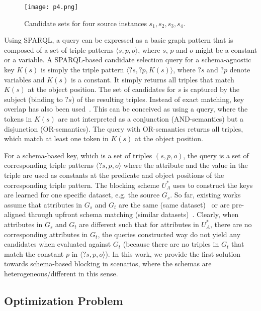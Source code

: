 \begin{figure} 
\centering
\texttt{[image: p4.png]}
\caption{Candidate sets for four source instances $s_1, s_2, s_3, s_4$.} 
\label{fig:candidates}
\end{figure} 
 
Using SPARQL, a query can be expressed as a basic graph pattern that is composed of a set of triple patterns $\langle s, p, o \rangle$, where $s$, $p$ and $o$ might be a constant or a variable. A SPARQL-based candidate selection query for a schema-agnostic key $K(s)$ is simply the triple pattern $\langle ?s, ?p, K(s) \rangle$, where $?s$ and $?p$ denote variables and $K(s)$ is a constant. It simply returns all triples that match $K(s)$ at the object position. The set of candidates for $s$ is captured by the subject (binding to $?s$) of the resulting triples. Instead of exact matching, key overlap has also been used~\cite{}. This can be conceived as using a query, where the tokens in $K(s)$ are not interpreted as a conjunction (AND-semantics) but a disjunction (OR-semantics). The query with OR-semantics returns all triples, which match at least one token in $K(s)$ at the object position. 

For a schema-based key, which is a set of triples $(s,p,o)$, the query is a set of corresponding triple patterns $\langle ?s, p, o \rangle$ where the attribute and the value in the triple are used as constants at the predicate and object positions of the corresponding triple pattern. The blocking scheme $U^*_A$ uses to construct the keys are learned for one specific dataset, e.g. the source $G_s$. So far, existing works assume that attributes in $G_s$ and $G_t$ are the same (same dataset)~\cite{} or are pre-aligned through upfront schema matching (similar datasets)~\cite{}. Clearly, when attributes in $G_s$ and $G_t$ are different such that for attributes in $U^*_A$, there are no corresponding attributes in $G_t$, the queries constructed way do not yield any candidates when evaluated against $G_t$ (because there are no triples in $G_t$ that match the constant $p$ in $\langle ?s, p, o \rangle$). In this work, we provide the first solution towards schema-based blocking in scenarios, where the schemas are heterogeneous/different in this sense. 



\subsection{Optimization Problem}

